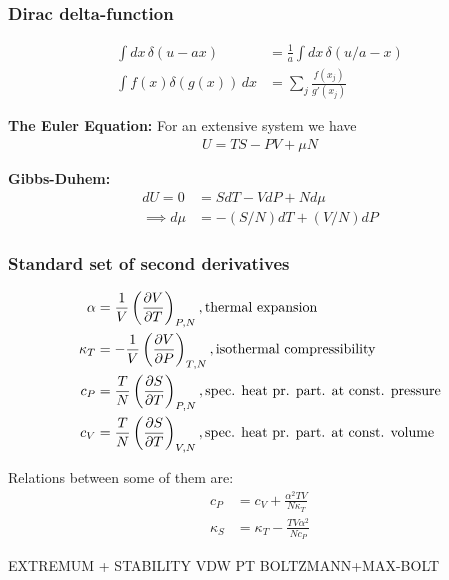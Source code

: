 \documentclass[a4paper, english, 12pt]{article}
\begin{document}
\begin{multicols*}{2}
\subsubsection*{\scriptsize Dirac delta-function}

\begin{align*}
    \int dx\,\delta(u-ax) &= \frac{1}{a}\int dx\,\delta(u/a - x) \\ 
    \int f(x)\delta(g(x))\,dx &= \sum_j \frac{f(x_j)}{g'(x_j)}
\end{align*}



\textbf{The Euler Equation:}
For an extensive system we have 
\begin{align*}
    U=TS-PV+\mu N
\end{align*}

\textbf{Gibbs-Duhem:}
\begin{align*}
    dU=0 &= SdT-VdP+Nd\mu \\ 
    \implies d\mu &= -(S/N)dT+(V/N)dP  
\end{align*}


\subsubsection*{\scriptsize Standard set of second derivatives}
\begin{align*}
    \alpha &= \frac{1}{V}\left(\pdv{V}{T} \right)_{P,N}, \text{thermal expansion} \\ 
    \kappa_T &= -\frac{1}{V}\left(\pdv{V}{P} \right)_{T,N}, \text{isothermal compressibility} \\ 
    c_P &= \frac{T}{N}\left(\pdv{S}{T} \right)_{P,N}, \text{spec. heat pr. part. at const. pressure} \\ 
    c_V &= \frac{T}{N}\left(\pdv{S}{T} \right)_{V,N}, \text{spec. heat pr. part. at const. volume}
\end{align*}

Relations between some of them are:
\begin{align*}
    c_P &= c_V + \frac{\alpha^2 TV}{N\kappa_T} \\ 
    \kappa_S &= \kappa_T - \frac{TV \alpha^2}{Nc_P}
\end{align*}




EXTREMUM + STABILITY 
VDW
PT 
BOLTZMANN+MAX-BOLT 

\subsection*{}


\end{multicols*}
\end{document}
